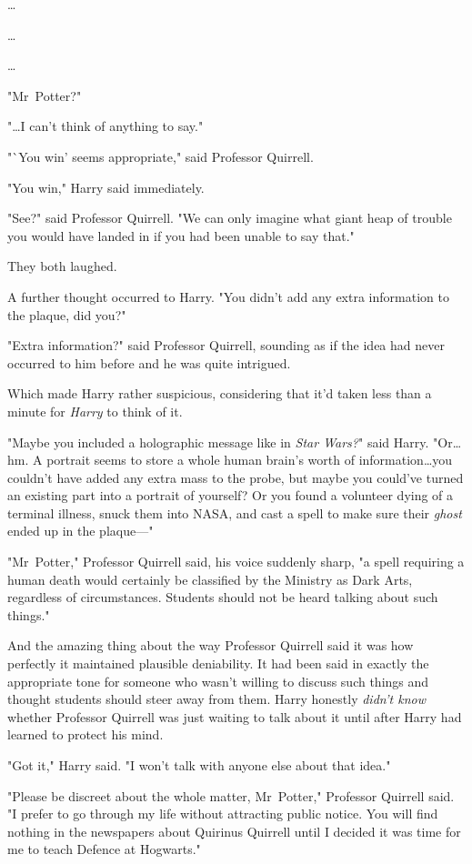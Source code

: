 …

…

…

"Mr~Potter?"

"…I can't think of anything to say."

"`You win' seems appropriate," said Professor Quirrell.

"You win," Harry said immediately.

"See?" said Professor Quirrell. "We can only imagine what giant heap of trouble
you would have landed in if you had been unable to say that."

They both laughed.

A further thought occurred to Harry. "You didn't add any extra information to
the plaque, did you?"

"Extra information?" said Professor Quirrell, sounding as if the idea had never
occurred to him before and he was quite intrigued.

Which made Harry rather suspicious, considering that it'd taken less than a
minute for \emph{Harry} to think of it.

"Maybe you included a holographic message like in \emph{Star Wars?}" said
Harry. "Or…hm. A portrait seems to store a whole human brain's worth of
information…you couldn't have added any extra mass to the probe, but
maybe you could've turned an existing part into a portrait of yourself? Or you
found a volunteer dying of a terminal illness, snuck them into NASA, and cast a
spell to make sure their \emph{ghost} ended up in the plaque—"

"Mr~Potter," Professor Quirrell said, his voice suddenly sharp, "a spell
requiring a human death would certainly be classified by the Ministry as Dark
Arts, regardless of circumstances. Students should not be heard talking about
such things."

And the amazing thing about the way Professor Quirrell said it was how
perfectly it maintained plausible deniability. It had been said in exactly the
appropriate tone for someone who wasn't willing to discuss such things and
thought students should steer away from them. Harry honestly \emph{didn't know}
whether Professor Quirrell was just waiting to talk about it until after Harry
had learned to protect his mind.

"Got it," Harry said. "I won't talk with anyone else about that idea."

"Please be discreet about the whole matter, Mr~Potter," Professor Quirrell
said. "I prefer to go through my life without attracting public notice. You
will find nothing in the newspapers about Quirinus Quirrell until I decided it
was time for me to teach Defence at Hogwarts."

